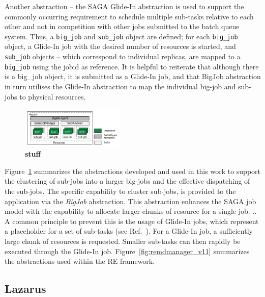 \documentclass[conference,final]{IEEEtran}
\newcommand{\jhanote}[1]{ {\textcolor{red} { ***Jha: #1 }}}
\newcommand{\yyenote}[1]{ {\textcolor{blue} { ***yye00: #1 }}}
\newcommand{\jhanote}[1]{}
\newcommand{\yyenote}[1]{}
\begin{document}


Another abstraction
-- the SAGA Glide-In abstraction is used to support the commonly
occurring requirement to schedule multiple sub-tasks relative to each
other and not in competition with other jobs submitted to the batch
queue system.  Thus, a \texttt{big\_job} and \texttt{sub\_job} object
are defined; for each \texttt{big\_job} object, a Glide-In job with
the desired number of resources is started, and \texttt{sub\_job}
objects -- which correspond to individual replicas, are mapped to a
\texttt{big\_job} using the jobid as reference. It is helpful to
reiterate that although there is a big\_job object, it is submitted
as a Glide-In job, and that BigJob abstraction in turn utilises the
Glide-In abstraction to map the individual big-job and sub-jobs to
physical resources.

\begin{figure}[t]
      \centering
      \includegraphics[width=0.44\textwidth]{./figures/enkf_bigjob.pdf}
      \caption{\footnotesize \bf stuff }
      \label{fig:abstractions}
\end{figure}

Figure~\ref{fig:abstractions} summarizes the abstractions developed
and used in this work to support the clustering of sub-jobs into a
larger big-jobs and the effective dispatching of the sub-jobs.  The
specific capability to cluster sub-jobs, is provided to the
application via the \emph{BigJob} abstraction. This abstraction
enhances the SAGA job model with the capability to allocate larger
chunks of resource for a single job.
.. A common principle to prevent this is the
usage of Glide-In jobs, which represent a placeholder for a set of
sub-tasks (see Ref.~\cite{citeulike:291860}).  For a Glide-In
job, a sufficiently large chunk of resources is requested. Smaller
sub-tasks can then rapidly be executed through the Glide-In job.
Figure~\ref{fig:remdmanager_v11} summarizes the abstractions used
within the RE framework.
\subsection{Lazarus}
\end{document}

